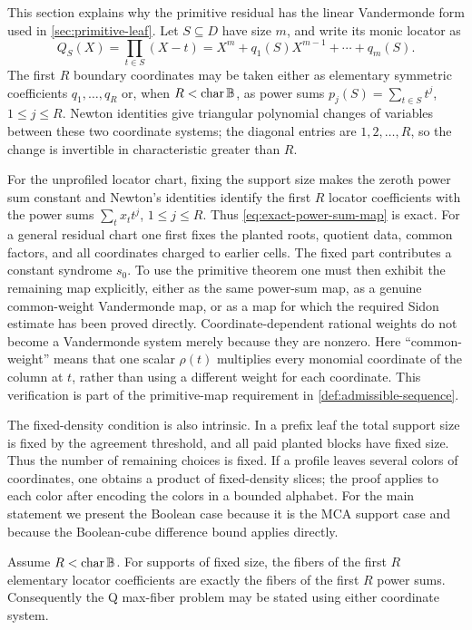 \documentclass[11pt,a4paper]{amsart}
\numberwithin{equation}{section}
\theoremstyle{remark}
\begin{document}
This section explains why the primitive residual has the linear Vandermonde form used in \cref{sec:primitive-leaf}.  Let \(S\subseteq D\) have size \(m\), and write its monic locator as
\[
        Q_S(X)=\prod_{t\in S}(X-t)=X^m+q_1(S)X^{m-1}+\cdots+q_m(S).
\]
The first \(R\) boundary coordinates may be taken either as elementary symmetric coefficients \(q_1,\ldots,q_R\) or, when \(R<\operatorname{char}\mathbb B\), as power sums \(p_j(S)=\sum_{t\in S}t^j\), \(1\le j\le R\).  Newton identities give triangular polynomial changes of variables between these two coordinate systems; the diagonal entries are \(1,2,\ldots,R\), so the change is invertible in characteristic greater than \(R\).

For the unprofiled locator chart, fixing the support size makes the zeroth
power sum constant and Newton's identities identify the first \(R\)
locator coefficients with the power sums
\(\sum_tx_tt^j\), \(1\le j\le R\).  Thus
\eqref{eq:exact-power-sum-map} is exact.  For a general residual chart one
first fixes the planted roots, quotient data, common factors, and all
coordinates charged to earlier cells.  The fixed part contributes a
constant syndrome \(s_0\).  To use the primitive theorem one must then
exhibit the remaining map explicitly, either as the same power-sum map, as
a genuine common-weight Vandermonde map, or as a map for which the required
Sidon estimate has been proved directly.  Coordinate-dependent rational
weights do not become a Vandermonde system merely because they are
nonzero.  Here ``common-weight'' means that one scalar \(\rho(t)\)
multiplies every monomial coordinate of the column at \(t\), rather than
using a different weight for each coordinate.  This verification is part of the primitive-map requirement in
\cref{def:admissible-sequence}.

The fixed-density condition is also intrinsic.  In a prefix leaf the total
support size is fixed by the agreement threshold, and all paid planted
blocks have fixed size.  Thus the number of remaining choices is fixed.  If
a profile leaves several colors of coordinates, one obtains a product of
fixed-density slices; the proof applies to each color after encoding the
colors in a bounded alphabet.  For the main statement we present the
Boolean case because it is the MCA support case and because the
Boolean-cube difference bound applies directly.

\begin{lemma}\label{lem:newton-equivalence}
Assume \(R<\operatorname{char}\mathbb B\).  For supports of fixed size, the fibers of the first \(R\) elementary locator coefficients are exactly the fibers of the first \(R\) power sums.  Consequently the Q max-fiber problem may be stated using either coordinate system.
\end{lemma}
\end{document}
